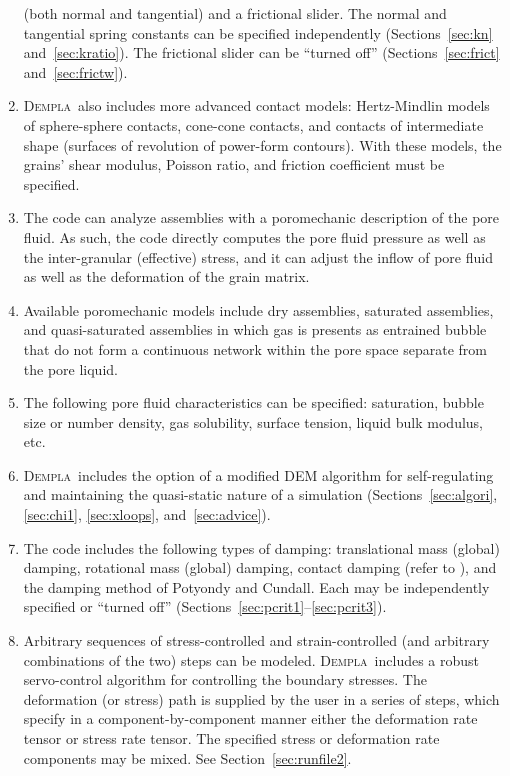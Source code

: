 \documentclass[letterpaper,11pt]{article}
\newcommand{\Dempla}{\textsc{Dempla}}
\begin{document}
\begin{enumerate}
(both normal and tangential) and
a frictional slider.  
The normal and tangential spring constants can
be specified independently (Sections~\ref{sec:kn} and~\ref{sec:kratio}).  
The frictional slider can be ``turned off''
(Sections~\ref{sec:frict} and~\ref{sec:frictw}).
\item
\Dempla\ also includes more advanced contact models:
Hertz-Mindlin models of sphere-sphere contacts, cone-cone contacts,
and contacts of intermediate shape (surfaces of revolution
of power-form contours).
With these models, the grains' shear modulus,
Poisson ratio, and friction coefficient must be specified.
\item
The code can analyze assemblies with a poromechanic description
of the pore fluid.
As such, the code directly computes the pore fluid pressure
as well as the inter-granular (effective) stress,
and it can adjust the inflow of pore fluid as well as the
deformation of the grain matrix.
\item
Available poromechanic models include dry assemblies,
saturated assemblies, and quasi-saturated assemblies in which
gas is presents as entrained bubble that do not form
a continuous network within the pore space separate from
the pore liquid.
\item
The following pore fluid characteristics can be specified:
saturation, bubble size or number density, gas solubility,
surface tension, liquid bulk modulus, etc.
\item
\Dempla\ includes
the option of a modified DEM algorithm for self-regulating 
and maintaining
the quasi-static nature of a simulation (Sections~\ref{sec:algori},
\ref{sec:chi1}, \ref{sec:xloops}, and~\ref{sec:advice}).
\item
The code includes the following types of damping:  
translational mass (global) damping,
rotational mass (global) damping, contact damping
(refer to \citep{Cundall:1979a}),
and the damping method of Potyondy and Cundall.  
Each may be
independently specified or ``turned off''
(Sections~\ref{sec:pcrit1}--\ref{sec:pcrit3}).
\item
Arbitrary sequences of stress-controlled and strain-controlled
(and arbitrary combinations of the two) steps can be modeled.
\Dempla\ includes a robust servo-control 
algorithm for controlling the boundary stresses.
The deformation (or stress) path is supplied by the
user in a series of steps, which
specify in a component-by-component manner either the deformation rate 
tensor or stress rate tensor.  The specified stress or deformation rate 
components may be mixed.  See Section~\ref{sec:runfile2}.

\end{enumerate}
\end{document}
